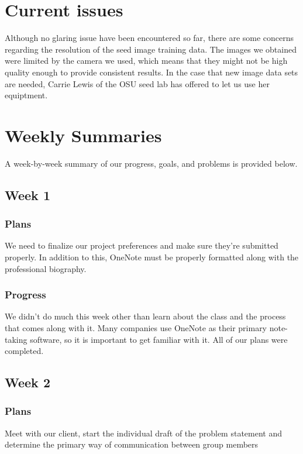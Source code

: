 \documentclass[onecolumn, draftclsnofoot,10pt, compsoc]{IEEEtran}
\begin{document}
\section{Current issues}

Although no glaring issue have been encountered so far, there are some concerns regarding the resolution of the seed image training data. The images we obtained were limited by the camera we used, which means that they might not be high quality enough to provide consistent results. In the case that new image data sets are needed, Carrie Lewis of the OSU seed lab has offered to let us use her equiptment. 

\clearpage

\section{Weekly Summaries}
	A week-by-week summary of our progress, goals, and problems is provided below. 
	\subsection{Week 1}
	
	    \subsubsection{Plans}
        We need to finalize our project preferences and make sure they're submitted properly. In addition to this, OneNote must be properly formatted along with the professional biography. 
        
    	\subsubsection{Progress}
    	We didn't do much this week other than learn about the class and the process that comes along with it. Many companies use OneNote as their primary note-taking software, so it is important to get familiar with it. All of our plans were completed.

    \subsection{Week 2}
        \subsubsection{Plans}
        Meet with our client, start the individual draft of the problem statement and
        determine the primary way of communication between group members
\end{document}
